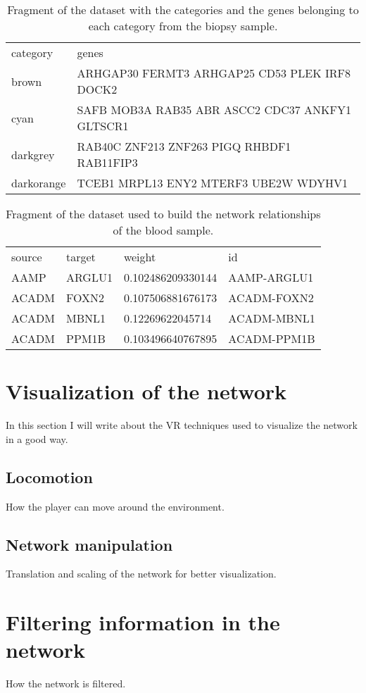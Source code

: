 \begin{table}[h!]
\centering
\begin{tabular}{ll}
\hline
category & genes          \\
brown   & ARHGAP30 FERMT3 ARHGAP25 CD53 PLEK IRF8 DOCK2\\
cyan  & SAFB MOB3A RAB35 ABR ASCC2 CDC37 ANKFY1 GLTSCR1\\
darkgrey  & RAB40C ZNF213 ZNF263 PIGQ RHBDF1 RAB11FIP3\\
darkorange  & TCEB1 MRPL13 ENY2 MTERF3 UBE2W WDYHV1\\
\hline
\end{tabular}
\caption{Fragment of the dataset with the categories and the genes belonging to each category from the biopsy sample.}
\label{tab:categories-data}
\end{table}

\begin{table}[h!]
\centering
\begin{tabular}{llll}
\hline
source & target & weight            & id          \\
AAMP   & ARGLU1 & 0.102486209330144 & AAMP-ARGLU1 \\
ACADM  & FOXN2  & 0.107506881676173 & ACADM-FOXN2 \\
ACADM  & MBNL1  & 0.12269622045714  & ACADM-MBNL1 \\
ACADM  & PPM1B  & 0.103496640767895 & ACADM-PPM1B \\
\hline
\end{tabular}
\caption{Fragment of the dataset used to build the network relationships of the blood sample.}
\label{tab:network-data}
\end{table}

\section{Visualization of the network}
In this section I will write about the VR techniques used to visualize the network in a good way.

\subsection{Locomotion}
How the player can move around the environment.

\subsection{Network manipulation}
Translation and scaling of the network for better visualization.

\section{Filtering information in the network}
How the network is filtered.
